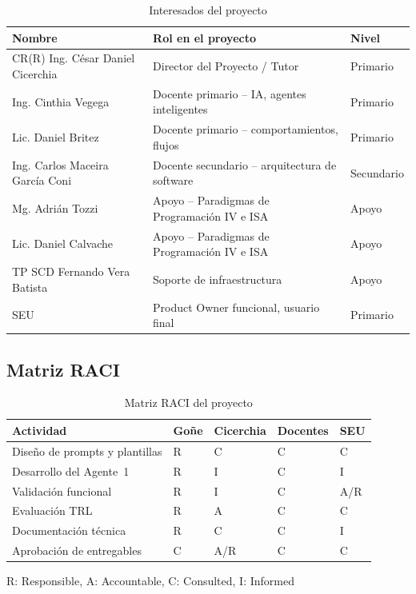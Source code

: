 \documentclass[a4paper, 12pt]{article}
\begin{document}
\begin{table}[H]
  \centering
  \caption{Interesados del proyecto}
  \label{tab:interesados}
  \begin{tabularx}{\textwidth}{l>{\raggedright\arraybackslash}Xl}
    \toprule
    \textbf{Nombre} & \textbf{Rol en el proyecto} & \textbf{Nivel} \\
    \midrule
    CR(R) Ing. C\'esar Daniel Cicerchia & Director del Proyecto / Tutor         & Primario \\
    Ing. Cinthia Vegega                  & Docente primario -- IA, agentes inteligentes & Primario \\
    Lic. Daniel Britez                   & Docente primario -- comportamientos, flujos  & Primario \\
    Ing. Carlos Maceira Garc\'ia Coni    & Docente secundario -- arquitectura de software & Secundario \\
    Mg. Adri\'an Tozzi                   & Apoyo -- Paradigmas de Programaci\'on IV e ISA & Apoyo \\
    Lic. Daniel Calvache                 & Apoyo -- Paradigmas de Programaci\'on IV e ISA & Apoyo \\
    TP SCD Fernando Vera Batista         & Soporte de infraestructura                     & Apoyo \\
    \ac{SEU}                             & Product Owner funcional, usuario final         & Primario \\
    \bottomrule
  \end{tabularx}
\end{table}

\subsection{Matriz RACI}

\begin{table}[H]
  \centering
  \caption{Matriz RACI del proyecto}
  \label{tab:raci}
  \footnotesize
  \begin{tabularx}{\textwidth}{l>{\centering\arraybackslash}X>{\centering\arraybackslash}X>{\centering\arraybackslash}X>{\centering\arraybackslash}X}
    \toprule
    \textbf{Actividad} & \textbf{Go\~ne} & \textbf{Cicerchia} & \textbf{Docentes} & \textbf{SEU} \\
    \midrule
    Dise\~no de prompts y plantillas   & R     & C     & C     & C \\
    Desarrollo del Agente~1            & R     & I     & C     & I \\
    Validaci\'on funcional             & R     & I     & C     & A/R \\
    Evaluaci\'on TRL                   & R     & A     & C     & C \\
    Documentaci\'on t\'ecnica         & R     & C     & C     & I \\
    Aprobaci\'on de entregables        & C     & A/R   & C     & C \\
    \bottomrule
  \end{tabularx}

  \vspace{0.2cm}
  \footnotesize{R: Responsible, A: Accountable, C: Consulted, I: Informed}
\end{table}
\end{document}
